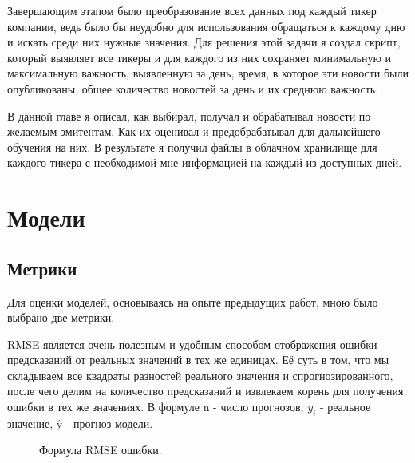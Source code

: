 \documentclass[12pt, a4paper]{article}
\begin{document}
Завершающим этапом было преобразование всех данных под каждый тикер компании, ведь было бы неудобно для использования обращаться к каждому дню и искать среди них нужные значения. Для решения этой задачи я создал скрипт, который выявляет все тикеры и для каждого из них сохраняет минимальную и максимальную важность, выявленную за день, время, в которое эти новости были опубликованы, общее количество новостей за день и их среднюю важность.

В данной главе я описал, как выбирал, получал и обрабатывал новости по желаемым эмитентам. Как их оценивал и предобрабатывал для дальнейшего обучения на них. В результате я получил файлы в облачном хранилище для каждого тикера с необходимой мне информацией на каждый из доступных дней. 

\section{Модели}

\subsection{Метрики}

Для оценки моделей, основываясь на опыте предыдущих работ, мною было выбрано две метрики.

RMSE  является очень полезным и удобным способом отображения ошибки предсказаний от реальных значений в тех же единицах. Её суть в том, что мы складываем все квадраты разностей реального значения и спрогнозированного, после чего делим на количество предсказаний и извлекаем корень для получения ошибки в тех же значениях. В формуле n - число прогнозов, $y_i$ - реальное значение, \^{y} - прогноз модели.
\begin{figure}[!h]
\caption{Формула RMSE ошибки.}
\label{fig:rmse}
\end{figure}
\end{document}
